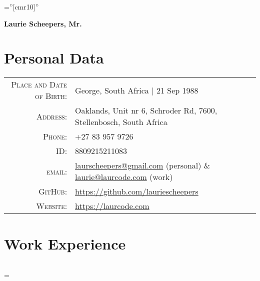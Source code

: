 \documentclass[a4paper,10pt,notitlepage]{article}
\newenvironment{absolutelynopagebreak}
  {\par\nobreak\vfil\penalty0\vfilneg
   \vtop\bgroup}
  {\par\xdef\tpd{\the\prevdepth}\egroup
   \prevdepth=\tpd}
\begin{document}
\pagestyle{empty} %

\font\fb=''[cmr10]'' %


\addtolength{\voffset}{-0.8cm} %

\begin{absolutelynopagebreak}
	
	\begin{center}
		\begin{center}
			\Huge\textbf{Laurie Scheepers, Mr.}
		\end{center}
	\end{center}
		
	\section{Personal Data}
	
	\begin{tabular}{rl}
		\textsc{Place and Date of Birth:} & George, South Africa  | 21 Sep 1988                                 \\
		\textsc{Address:}                 & Oaklands, Unit nr 6, Schroder Rd, 7600, Stellenbosch, South Africa \\
		\textsc{Phone:}                   & +27 83 957 9726                                                     \\
		\textsc{ID:}                      & 8809215211083                                                       \\
		\textsc{email:}                   & \href{mailto:laurscheepers@gmail.com}{laurscheepers@gmail.com} (personal) \& \href{mailto:laurie@laurcode.com}{laurie@laurcode.com} (work)      \\
		\textsc{GitHub:}                  & \href{https://github.com/lauriescheepers}{https://github.com/lauriescheepers} \\
		\textsc{Website:}                 & \href{https://laurcode.com}{https://laurcode.com}
	\end{tabular}
	
	
	\section{Work Experience}
	\begin{tabular}{r|p{11cm}}
	

\end{tabular}
\end{absolutelynopagebreak}
\end{document}
